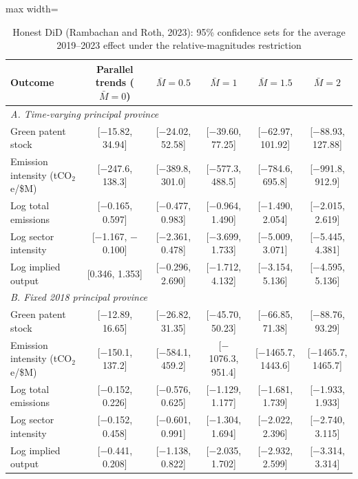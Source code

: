 \begin{table}[htbp]\centering\footnotesize
\caption{Honest DiD (Rambachan and Roth, 2023): 95\% confidence sets for the average 2019--2023 effect under the relative-magnitudes restriction}
\label{tab:honest}
\begin{adjustbox}{max width=\textwidth}
\begin{tabular}{lccccc}
\toprule
Outcome & Parallel trends ($\bar M=0$) & $\bar M=0.5$ & $\bar M=1$ & $\bar M=1.5$ & $\bar M=2$ \\
\midrule
\multicolumn{6}{l}{\textit{A. Time-varying principal province}} \\
\quad Green patent stock & [$-$15.82, 34.94] & [$-$24.02, 52.58] & [$-$39.60, 77.25] & [$-$62.97, 101.92] & [$-$88.93, 127.88] \\
\quad Emission intensity (tCO$_2$e/\$M) & [$-$247.6, 138.3] & [$-$389.8, 301.0] & [$-$577.3, 488.5] & [$-$784.6, 695.8] & [$-$991.8, 912.9] \\
\quad Log total emissions & [$-$0.165, 0.597] & [$-$0.477, 0.983] & [$-$0.964, 1.490] & [$-$1.490, 2.054] & [$-$2.015, 2.619] \\
\quad Log sector intensity & [$-$1.167, $-$0.100] & [$-$2.361, 0.478] & [$-$3.699, 1.733] & [$-$5.009, 3.071] & [$-$5.445, 4.381] \\
\quad Log implied output & [0.346, 1.353] & [$-$0.296, 2.690] & [$-$1.712, 4.132] & [$-$3.154, 5.136] & [$-$4.595, 5.136] \\
\multicolumn{6}{l}{\textit{B. Fixed 2018 principal province}} \\
\quad Green patent stock & [$-$12.89, 16.65] & [$-$26.82, 31.35] & [$-$45.70, 50.23] & [$-$66.85, 71.38] & [$-$88.76, 93.29] \\
\quad Emission intensity (tCO$_2$e/\$M) & [$-$150.1, 137.2] & [$-$584.1, 459.2] & [$-$1076.3, 951.4] & [$-$1465.7, 1443.6] & [$-$1465.7, 1465.7] \\
\quad Log total emissions & [$-$0.152, 0.226] & [$-$0.576, 0.625] & [$-$1.129, 1.177] & [$-$1.681, 1.739] & [$-$1.933, 1.933] \\
\quad Log sector intensity & [$-$0.152, 0.458] & [$-$0.601, 0.991] & [$-$1.304, 1.694] & [$-$2.022, 2.396] & [$-$2.740, 3.115] \\
\quad Log implied output & [$-$0.441, 0.208] & [$-$1.138, 0.822] & [$-$2.035, 1.702] & [$-$2.932, 2.599] & [$-$3.314, 3.314] \\
\bottomrule
\end{tabular}
\end{adjustbox}

\end{table}
